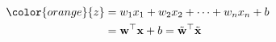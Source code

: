 \documentclass[preview]{standalone}
\begin{document}
\begin{align}
\color{orange}{z} &= w_1 x_1 + w_2 x_2 + \dots + w_n x_n + b \\ &= \mathbf{w}^\top \mathbf{x} + b = \tilde{\mathbf{w}}^\top \tilde{\mathbf{x}}
\end{align}
\end{document}
